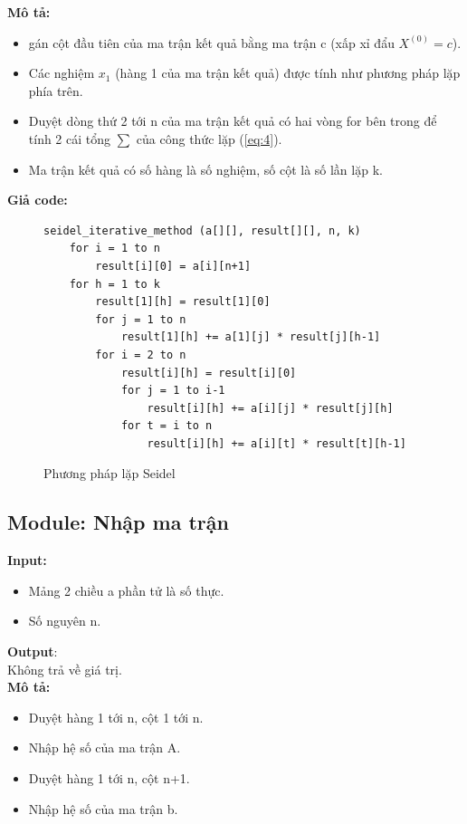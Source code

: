 \documentclass[twoside]{report2}
\begin{document}
\textbf{Mô tả:}
\begin{itemize}
\item gán cột đầu tiên của ma trận kết quả bằng ma trận c (xấp xỉ đẩu $X^{(0)} = c$).
\item Các nghiệm $x_1$ (hàng 1 của ma trận kết quả) được tính như phương pháp lặp phía trên.
\item Duyệt dòng thứ 2 tới n của ma trận kết quả có hai vòng for bên trong để tính 2 cái tổng $\sum$ của công thức lặp (\ref{eq:4}).
\item Ma trận kết quả có số hàng là số nghiệm, số cột là số lần lặp k.
\end{itemize}


\textbf{Giả code:}
\begin{figure}[h]
\begin{lstlisting}[frame=single]
seidel_iterative_method (a[][], result[][], n, k)
    for i = 1 to n
        result[i][0] = a[i][n+1]
    for h = 1 to k
        result[1][h] = result[1][0]
        for j = 1 to n
            result[1][h] += a[1][j] * result[j][h-1]
        for i = 2 to n
            result[i][h] = result[i][0]
            for j = 1 to i-1
                result[i][h] += a[i][j] * result[j][h]
            for t = i to n
                result[i][h] += a[i][t] * result[t][h-1]
\end{lstlisting}
\caption{Phương pháp lặp Seidel}
\end{figure}

\newpage
\subsection{Module: Nhập ma trận}
\textbf{Input:}
\begin{itemize}
\item Mảng 2 chiều a phần tử là số thực.
\item Số nguyên n.
\end{itemize}
\textbf{Output}:\\

\quad Không trả về giá trị.\\

\textbf{Mô tả:}
\begin{itemize}
\item Duyệt hàng 1 tới n, cột 1 tới n.
\item Nhập hệ số của ma trận A.
\item Duyệt hàng 1 tới n, cột n+1.
\item Nhập hệ số của ma trận b.
\end{itemize}
\end{document}
